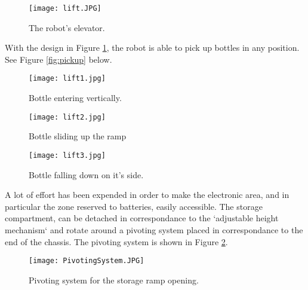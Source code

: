 \begin{figure}[H]
 \centering
 \texttt{[image: lift.JPG]}
 \caption{The robot's elevator.}
\label{fig:lift}
\end{figure}

With the design in Figure \ref{fig:lift}, the robot is able to pick up bottles in any position. See Figure \ref{fig:pickup} below.

\begin{minipage}{\linewidth}
      \centering
      \begin{minipage}{0.3\linewidth}
          \begin{figure}[H]
              \texttt{[image: lift1.jpg]}
              \caption{Bottle entering vertically.}
          \end{figure}
      \end{minipage}
      \hspace{0.05\linewidth}
      \begin{minipage}{0.3\linewidth}
          \begin{figure}[H]
              \texttt{[image: lift2.jpg]}
              \caption{Bottle sliding up the ramp}
          \end{figure}
      \end{minipage}
      \hspace{0.05\linewidth}
      \begin{minipage}{0.3\linewidth}
          \begin{figure}[H]
              \texttt{[image: lift3.jpg]}
              \caption{Bottle falling down on it's side.}
          \end{figure}
      \end{minipage}
      \label{fig:pickup}
  \end{minipage}

A lot of effort has been expended in order to make the electronic area, and in particular the zone reserved to batteries, easily accessible.
The storage compartment, can be detached in correspondance to the `adjustable height mechanism` and rotate around a pivoting system placed in correspondance to the end of the chassis.
The pivoting system is shown in Figure \ref{fig:PivotingSystem}.

\begin{figure}[H]
 \centering
 \texttt{[image: PivotingSystem.JPG]}
 \caption{Pivoting system for the storage ramp opening.}
\label{fig:PivotingSystem}
\end{figure}

